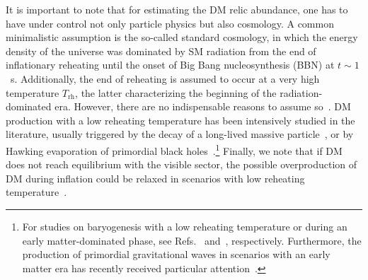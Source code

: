 \documentclass[a4paper,11pt]{article}
\newcommand{\Trh}{T_\text{rh}}
\begin{document}
It is important to note that for estimating the DM relic abundance, one has to have under control not only particle physics but also cosmology.
A common minimalistic assumption is the so-called standard cosmology, in which the energy density of the universe was dominated by SM radiation from the end of inflationary reheating until the onset of Big Bang nucleosynthesis (BBN) at $t \sim 1$~s.
Additionally, the end of reheating is assumed to occur at a very high temperature $\Trh$, the latter characterizing the beginning of the radiation-dominated era.
However, there are no indispensable reasons to assume so~\cite{Allahverdi:2020bys}.
DM production with a low reheating temperature has been intensively studied in the literature, usually triggered by the decay of a long-lived massive particle~\cite{Giudice:2000ex, Fornengo:2002db, Pallis:2004yy, Gelmini:2006pw, Drees:2006vh, Yaguna:2011ei, Roszkowski:2014lga, Drees:2017iod, Bernal:2018ins, Bernal:2018kcw, Cosme:2020mck, Arias:2021rer, Bernal:2022wck, Bhattiprolu:2022sdd, Haque:2023yra, Ghosh:2023tyz}, or by Hawking evaporation of primordial black holes~\cite{Green:1999yh, Khlopov:2004tn, Dai:2009hx, Fujita:2014hha, Allahverdi:2017sks, Lennon:2017tqq, Morrison:2018xla, Hooper:2019gtx, Chaudhuri:2020wjo, Masina:2020xhk, Baldes:2020nuv, Gondolo:2020uqv, Bernal:2020kse, Bernal:2020ili, Bernal:2020bjf, Bernal:2021akf, Cheek:2021odj, Cheek:2021cfe, Bernal:2021yyb, Bernal:2021bbv, Bernal:2022oha, Cheek:2022dbx, Mazde:2022sdx, Cheek:2022mmy}.\footnote{For studies on baryogenesis with a low reheating temperature or during an early matter-dominated phase, see Refs.~\cite{Davidson:2000dw, Giudice:2000ex, Allahverdi:2010im, Beniwal:2017eik, Allahverdi:2017edd} and~\cite{Bernal:2017zvx, Chen:2019etb, Bernal:2022pue, Chakraborty:2022gob}, respectively. Furthermore, the production of primordial gravitational waves in scenarios with an early matter era has recently received particular attention~\cite{Assadullahi:2009nf, Durrer:2011bi, Alabidi:2013lya, DEramo:2019tit, Bernal:2019lpc, Figueroa:2019paj, Bernal:2020ywq}.}
Finally, we note that if DM does not reach equilibrium with the visible sector, the possible overproduction of DM during inflation could be relaxed in scenarios with low reheating temperature~\cite{Bernal:2018hjm, Garcia:2022vwm, Kaneta:2022gug, Garcia:2023qab, Cosme:2023xpa}.
\end{document}
